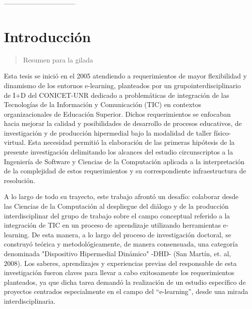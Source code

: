 --------------------------------
\parskip=0.6cm

\chapter{Introducción}\label{cap:introduccion}


\begin{abstract}
Resumen para la gilada
\end{abstract}





    Esta tesis se inició en el 2005 atendiendo a requerimientos de mayor
flexibilidad y dinamismo de los entornos e-learning, planteados por un
grupointerdisciplinario de I+D del CONICET-UNR dedicado a problemáticas de
integración de las Tecnologías de la Información y Comunicación (TIC)
en contextos organizacionales de Educación Superior. Dichos requerimientos se
enfocaban hacia mejorar la calidad y posibilidades de desarrollo de procesos
educativos, de investigación y de producción hipermedial bajo la modalidad de
taller físico-virtual. Esta necesidad permitió la elaboración de las primeras
hipótesis de la presente investigación delimitando los alcances del estudio
circunscriptos a la Ingeniería de Software y Ciencias de la Computación aplicada
a la interpretación de la complejidad de estos requerimientos y su
correspondiente infraestructura de resolución.

A lo largo de todo su trayecto, este trabajo afrontó un desafío: colaborar desde las Ciencias de la Computación al despliegue del diálogo y de la producción interdisciplinar del grupo de trabajo sobre el campo conceptual referido a la integración de TIC en un proceso de aprendizaje utilizando herramientas e-learning.  De esta manera, a lo largo del proceso de investigación doctoral, se construyó teórica y metodológicamente, de manera consensuada, una categoría denominada "Dispositivo Hipermedial Dinámico" -DHD- (San Martín, et. al, 2008). Los saberes, aprendizajes y experiencias previas del responsable de esta investigación fueron claves para llevar a cabo exitosamente los requerimientos planteados, ya que dicha tarea demandó la realización de un estudio específico de proyectos centrados especialmente en el campo del “e-learning'', desde una mirada interdisciplinaria. 

